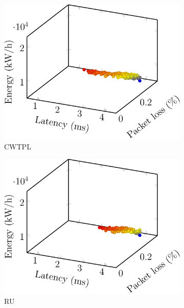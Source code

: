 \begin{figure}[t!]
    \begin{subfigure}[b]{0.32\linewidth}
        \includegraphics[width=\textwidth]{graphs/model/constant_energy-crop}
        \caption{CWTPL}
    \end{subfigure}
    \begin{subfigure}[b]{0.32\linewidth}
        \includegraphics[width=\textwidth]{graphs/model/resources_energy-crop}
        \caption{RU}
    \end{subfigure}
    \begin{subfigure}[b]{0.32\linewidth}

\end{subfigure}
\end{figure}
